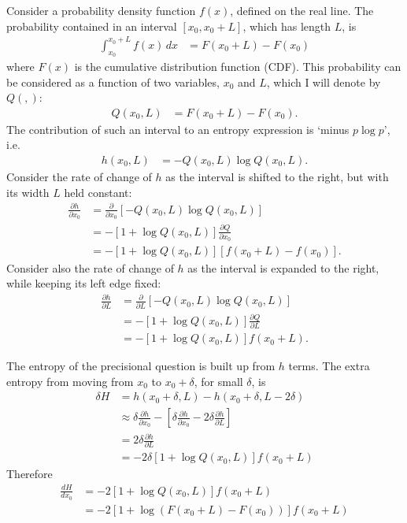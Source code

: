 \documentclass[entropy,article,accept,oneauthor,pdftex,10pt,a4paper]{mdpi}
\begin{document}
Consider a probability density function $f(x)$, defined on the real
line. The probability contained in an interval
$[x_0, x_0 + L]$, which has length $L$, is
\begin{align}
\int_{x_0}^{x_0 + L} f(x) \, dx &= F(x_0 + L) - F(x_0)
\end{align}
where $F(x)$ is the cumulative distribution function (CDF).
This probability can be considered as a function of two variables,
$x_0$ and $L$, which I will denote by $Q(,)$:
\begin{align}
Q(x_0, L) &= F(x_0 + L) - F(x_0).
\end{align}
The contribution of such an interval to an entropy expression
is `minus $p\log p$', i.e.
\begin{align}
h(x_0, L) &= -Q(x_0, L) \log Q(x_0, L).
\end{align}
Consider the rate of change of $h$ as the interval is shifted to
the right, but with its width $L$ held constant:
\begin{align}
\frac{\partial h}{\partial x_0} &= \frac{\partial}{\partial x_0}
    \left[-Q(x_0, L) \log Q(x_0, L)\right] \\
    &= -\left[1 + \log Q(x_0, L)\right]\frac{\partial Q}{\partial x_0} \\
    &= -\left[1 + \log Q(x_0, L)\right]\left[f(x_0 + L) - f(x_0)\right].
\end{align}
Consider also the rate of change of $h$ as the interval is
expanded to the right, while keeping its left edge fixed:
\begin{align}
\frac{\partial h}{\partial L} &= \frac{\partial}{\partial L}
    \left[-Q(x_0, L) \log Q(x_0, L)\right] \\
    &= -\left[1 + \log Q(x_0, L)\right]\frac{\partial Q}{\partial L} \\
    &= -\left[1 + \log Q(x_0, L)\right]f(x_0 + L).
\end{align}

The entropy of the precisional question is built up from
$h$ terms. The extra entropy from moving from $x_0$ to
$x_0 + \delta$, for small $\delta$, is
\begin{align}
\delta H &= h(x_0 + \delta, L) - h(x_0 + \delta, L - 2\delta) \\
 &\approx \delta \frac{\partial h}{\partial x_0}
    - \left[\delta \frac{\partial h}{\partial x_0}
            -2\delta \frac{\partial h}{\partial L}\right] \\
 &= 2\delta \frac{\partial h}{\partial L} \\
 &= -2\delta\left[1 + \log Q(x_0, L)\right]f(x_0 + L)
\end{align}
Therefore
\begin{align}
\frac{dH}{dx_0} &= -2\left[1 + \log Q(x_0, L)\right]f(x_0 + L) \\
  &= -2\left[1 + \log \left(F(x_0 + L) - F(x_0)\right)\right]f(x_0 + L)
\end{align}



%

\end{document}
